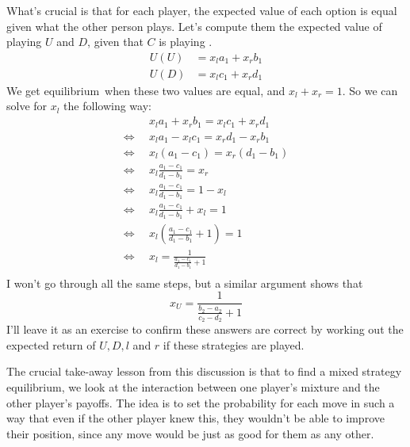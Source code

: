What's crucial is that for each player, the expected value of each option is equal given what the other person plays. Let's compute them the expected value of playing $U$ and $D$, given that $C$ is playing .
\begin{align*}
U(U) &= x_la_1 + x_rb_1 \\
U(D) &= x_lc_1 + x_rd_1
\end{align*} We get equilibrium\ when these two values are equal, and $x_l + x_r = 1$. So we can solve for $x_l$ the following way:
\begin{align*}
&x_la_1 +x_rb_1 = x_lc_1 + x_rd_1 \\
\Leftrightarrow \hspace{6pt} &x_la_1 -x_lc_1 = x_rd_1 - x_rb_1 \\
\Leftrightarrow \hspace{6pt} &x_l(a_1 - c_1) = x_r(d_1 - b_1) \\
\Leftrightarrow \hspace{6pt} &x_l\frac{a_1 - c_1}{d_1 - b_1} = x_r \\
\Leftrightarrow \hspace{6pt} &x_l\frac{a_1 - c_1}{d_1 - b_1} = 1 - x_l \\
\Leftrightarrow \hspace{6pt} &x_l\frac{a_1 - c_1}{d_1 - b_1} + x_l= 1 \\
\Leftrightarrow \hspace{6pt} &x_l(\frac{a_1 - c_1}{d_1 - b_1} + 1)= 1 \\
\Leftrightarrow \hspace{6pt} &x_l= \frac{1}{\frac{a_1 - c_1}{d_1 - b_1} + 1} \\
\end{align*}
I won't go through all the same steps, but a similar argument shows that
\begin{equation*}
x_U = \frac{1}{\frac{b_2 - a_2}{c_2 - d_2}+1}
\end{equation*}
I'll leave it as an exercise to confirm these answers are correct by working out the expected return of $U, D, l$ and $r$ if these strategies are played.

The crucial take-away lesson from this discussion is that to find a mixed strategy equilibrium, we look at the interaction between one player's mixture and the other player's payoffs. The idea is to set the probability for each move in such a way that even if the other player knew this, they wouldn't be able to improve their position, since any move would be just as good for them as any other.

